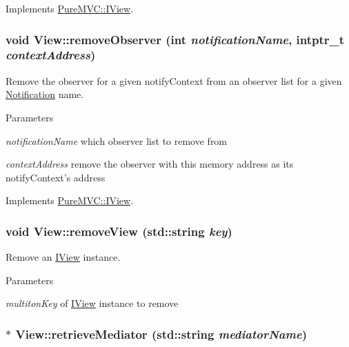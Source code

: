 Implements \hyperlink{class_pure_m_v_c_1_1_i_view_a569728502b696d2e195b80ebfd8b85eb}{PureMVC::IView}.\hypertarget{class_pure_m_v_c_1_1_view_a950c0a587a04909a8301f236f8501de2}{
\subsubsection[{removeObserver}]{\setlength{\rightskip}{0pt plus 5cm}void View::removeObserver (int {\em notificationName}, \/  intptr\_\-t {\em contextAddress})}}
\label{class_pure_m_v_c_1_1_view_a950c0a587a04909a8301f236f8501de2}


Remove the observer for a given notifyContext from an observer list for a given \hyperlink{class_pure_m_v_c_1_1_notification}{Notification} name. 
\begin{DoxyParams}{Parameters}
\item[{\em notificationName}]which observer list to remove from \item[{\em contextAddress}]remove the observer with this memory address as its notifyContext's address \end{DoxyParams}


Implements \hyperlink{class_pure_m_v_c_1_1_i_view_a0e97969101608e8486b964b3888dd0e6}{PureMVC::IView}.\hypertarget{class_pure_m_v_c_1_1_view_aac1d2aea65c021664a89319d9e3159b3}{
\subsubsection[{removeView}]{\setlength{\rightskip}{0pt plus 5cm}void View::removeView (std::string {\em key})}}
\label{class_pure_m_v_c_1_1_view_aac1d2aea65c021664a89319d9e3159b3}


Remove an \hyperlink{class_pure_m_v_c_1_1_i_view}{IView} instance. 
\begin{DoxyParams}{Parameters}
\item[{\em multitonKey}]of \hyperlink{class_pure_m_v_c_1_1_i_view}{IView} instance to remove \end{DoxyParams}
\hypertarget{class_pure_m_v_c_1_1_view_a108934f0fe48f40f715a0f310d40a26e}{
\subsubsection[{retrieveMediator}]{ $\ast$ View::retrieveMediator (std::string {\em mediatorName})}}
\label{class_pure_m_v_c_1_1_view_a108934f0fe48f40f715a0f310d40a26e}


